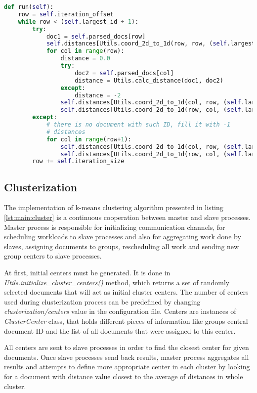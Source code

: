 \begin{lstlisting}[language=Python, caption={Distance.run() - Distance class process main method}, label={lst:distance:run}]
def run(self):
    row = self.iteration_offset
    while row < (self.largest_id + 1):
        try:
            doc1 = self.parsed_docs[row]
            self.distances[Utils.coord_2d_to_1d(row, row, (self.largest_id + 1))] = 1.0
            for col in range(row):
                distance = 0.0
                try:
                    doc2 = self.parsed_docs[col]
                    distance = Utils.calc_distance(doc1, doc2)
                except:
                    distance = -2
                self.distances[Utils.coord_2d_to_1d(col, row, (self.largest_id + 1))] = distance
                self.distances[Utils.coord_2d_to_1d(row, col, (self.largest_id + 1))] = distance
        except:
            # there is no document with such ID, fill it with -1
            # distances
            for col in range(row+1):
                self.distances[Utils.coord_2d_to_1d(col, row, (self.largest_id + 1))] = -1
                self.distances[Utils.coord_2d_to_1d(row, col, (self.largest_id + 1))] = -1
        row += self.iteration_size
\end{lstlisting}

\subsection{Clusterization}

The implementation of k-means clustering algorithm presented in listing \ref{lst:main:cluster} is a continuous cooperation between master and slave processes. Master process is responsible for initializing communication channels, for scheduling workloads to slave processes and also for aggregating work done by slaves, assigning documents to groups, rescheduling all work and sending new group centers to slave processes.

At first, initial centers must be generated. It is done in \textit{Utils.initialize\_cluster\_centers()} method, which returns a set of randomly selected documents that will act as initial cluster centers. The number of centers used during clusterization process can be predefined by changing \textit{clusterization/centers} value in the configuration file. Centers are instances of \textit{ClusterCenter} class, that holds different pieces of information like groups central document ID and the list of all documents that were assigned to this center.

All centers are sent to slave processes in order to find the closest center for given documents. Once slave processes send back results, master process aggregates all results and attempts to define more appropriate center in each cluster by looking for a document with distance value closest to the average of distances in whole cluster. 

